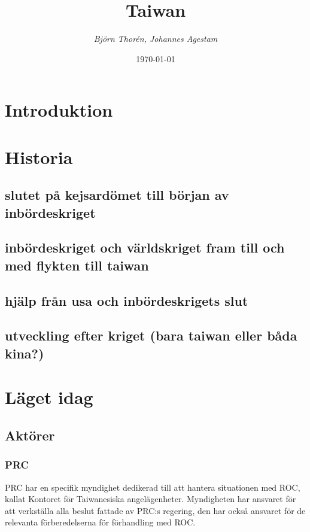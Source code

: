 \documentclass[a4paper,10pt]{article}
\title{\Huge\bf{Taiwan}\\}
\author{\emph{Björn Thorén, Johannes Agestam}}
\date{\today}
\begin{document}
\maketitle


\section*{Introduktion}

\section*{Historia}

\subsection*{slutet på kejsardömet till början av inbördeskriget}

\subsection*{inbördeskriget och världskriget fram till och med flykten till taiwan}

\subsection*{hjälp från usa och inbördeskrigets slut}

\subsection*{utveckling efter kriget (bara taiwan eller båda kina?)}


\section*{Läget idag}


\subsection*{Aktörer}

\subsubsection*{PRC}
PRC har en specifik myndighet dedikerad till att hantera situationen med ROC, kallat Kontoret för Taiwanesiska angelägenheter. Myndigheten har ansvaret för att verkställa alla beslut fattade av PRC:s regering, den har också ansvaret för de relevanta förberedelserna för förhandling med ROC.
\end{document}
